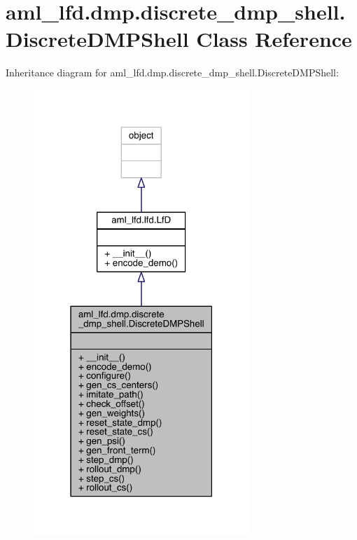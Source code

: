\hypertarget{classaml__lfd_1_1dmp_1_1discrete__dmp__shell_1_1_discrete_d_m_p_shell}{}\section{aml\+\_\+lfd.\+dmp.\+discrete\+\_\+dmp\+\_\+shell.\+Discrete\+D\+M\+P\+Shell Class Reference}
\label{classaml__lfd_1_1dmp_1_1discrete__dmp__shell_1_1_discrete_d_m_p_shell}


Inheritance diagram for aml\+\_\+lfd.\+dmp.\+discrete\+\_\+dmp\+\_\+shell.\+Discrete\+D\+M\+P\+Shell\+:\nopagebreak
\begin{figure}[H]
\begin{center}
\leavevmode
\includegraphics[width=231pt]{classaml__lfd_1_1dmp_1_1discrete__dmp__shell_1_1_discrete_d_m_p_shell__inherit__graph}
\end{center}
\end{figure}


